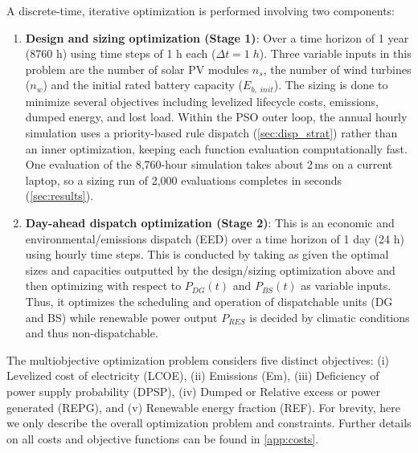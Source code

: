 \documentclass[final,3p,times]{elsarticle}
\begin{document}
A discrete-time, iterative optimization is performed involving two components:

\begin{enumerate}
    \item \textbf{Design and sizing optimization (Stage 1)}: Over a time horizon of 1 year (8760 h) using time steps of 1 h each ($\Delta t = 1\;h$). Three variable inputs in this problem are the number of solar PV modules $n_s$, the number of wind turbines ($n_w$) and the initial rated battery capacity ($E_{b,\;init}$). The sizing is done to minimize several objectives including levelized lifecycle costs, emissions, dumped energy, and lost load. Within the PSO outer loop, the annual hourly simulation uses a priority-based rule dispatch (\cref{sec:disp_strat}) rather than an inner optimization, keeping each function evaluation computationally fast. One evaluation of the 8,760-hour simulation takes about 2\,ms on a current laptop, so a sizing run of 2,000 evaluations completes in seconds (\cref{sec:results}).
    \item \textbf{Day-ahead dispatch optimization (Stage 2)}: This is an economic and environmental/emissions dispatch (EED) over a time horizon of 1 day (24 h) using hourly time steps. This is conducted by taking as given the optimal sizes and capacities outputted by the design/sizing optimization above and then optimizing with respect to $P_{DG}(t)$ and $P_{BS}(t)$ as variable inputs. Thus, it optimizes the scheduling and operation of dispatchable units (DG and BS) while renewable power output $P_{RES}$ is decided by climatic conditions and thus non-dispatchable.
\end{enumerate}

The multiobjective optimization problem considers five distinct objectives: (i) Levelized cost of electricity (LCOE), (ii) Emissions (Em), (iii) Deficiency of power supply probability (DPSP), (iv) Dumped or Relative excess or power generated (REPG), and (v) Renewable energy fraction (REF). For brevity, here we only describe the overall optimization problem and constraints. Further details on all costs and objective functions can be found in \cref{app:costs}. 
\end{document}
